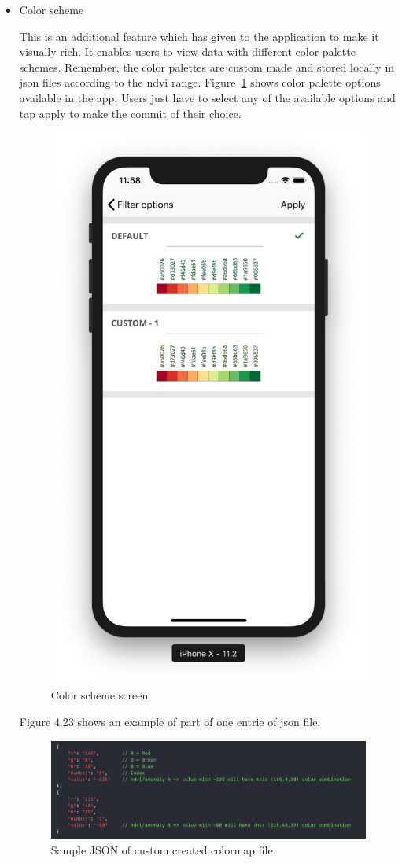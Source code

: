 \begin{itemize}
    \item Color scheme
    
    
    This is an additional feature which has given to the application to make it visually rich. It enables users to view data with different color palette schemes. Remember, the color palettes are custom made and stored locally in \gls{json} files according to the \gls{ndvi} range. Figure~\ref{fig:color_scheme_screen} shows color palette options available in the app. Users just have to select any of the available options and tap apply to make the commit of their choice.
    
     \begin{figure}[H]
            \centering
            \includegraphics[width=0.25\linewidth]{figures/ch4/color_scheme.png}
            \caption{\label{fig:color_scheme_screen} Color scheme screen}
    \end{figure}
        
    Figure 4.23 shows an example of part of one entrie of \gls{json} file.
    
    \begin{figure}[H]
            \centering
            \includegraphics[width=1.0\linewidth]{figures/ch4/color_map_final.png}
            \caption{\label{fig:color_json} Sample JSON of custom created colormap file}
    \end{figure}

\end{itemize}


